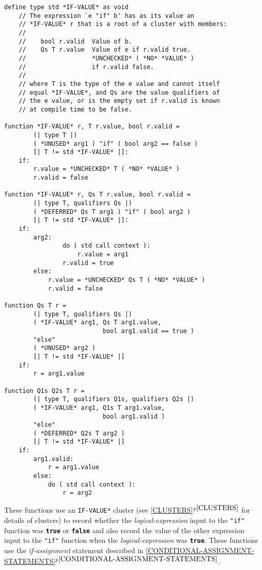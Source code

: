 \documentclass[12pt]{article}
\newcommand{\TT}[1]{{\tt \bfseries #1}}
\newcommand{\itemref}[1]{\ref{#1}$^{p\pageref{#1}}$}
\newenvironment{indpar}[1][0.3in]%
	{\begin{list}{}%
		     {\setlength{\itemsep}{0in}%
		      \setlength{\topsep}{0in}%
		      \setlength{\parsep}{1ex}%
		      \setlength{\labelwidth}{#1}%
		      \setlength{\leftmargin}{#1}%
		      \addtolength{\leftmargin}{\labelsep}}%
	 \item}%
	{\end{list}}
\begin{document}
\begin{indpar}\label{IF-ELSE-IMPLEMENTATION}\begin{verbatim}
define type std *IF-VALUE* as void
    // The expression `e "if" b' has as its value an
    // *IF-VALUE* r that is a root of a cluster with members:
    //
    //    bool r.valid  Value of b.
    //    Qs T r.value  Value of e if r.valid true.
    //                  *UNCHECKED* ( *NO* *VALUE* )
    //                  if r.valid false.
    //
    // where T is the type of the e value and cannot itself
    // equal *IF-VALUE*, and Qs are the value qualifiers of
    // the e value, or is the empty set if r.valid is known
    // at compile time to be false.

function *IF-VALUE* r, T r.value, bool r.valid =
        (| type T |)
        ( *UNUSED* arg1 ) "if" ( bool arg2 == false )
        [| T != std *IF-VALUE* |]:
    if:
        r.value = *UNCHECKED* T ( *NO* *VALUE* )
        r.valid = false

function *IF-VALUE* r, Qs T r.value, bool r.valid =
        (| type T, qualifiers Qs |)
        ( *DEFERRED* Qs T arg1 ) "if" ( bool arg2 )
        [| T != std *IF-VALUE* |]:
    if:
        arg2:
                do ( std call context ):
                    r.value = arg1
                r.valid = true
        else:
            r.value = *UNCHECKED* Qs T ( *NO* *VALUE* )
            r.valid = false

function Qs T r =
        (| type T, qualifiers Qs |)
        ( *IF-VALUE* arg1, Qs T arg1.value,
                           bool arg1.valid == true )
        "else"
        ( *UNUSED* arg2 )
        [| T != std *IF-VALUE* |]
    if:
        r = arg1.value

function Q1s Q2s T r =
        (| type T, qualifiers Q1s, qualifiers Q2s |)
        ( *IF-VALUE* arg1, Q1s T arg1.value,
                           bool arg1.valid )
        "else"
        ( *DEFERRED* Q2s T arg2 )
        [| T != std *IF-VALUE* |]
    if:
        arg1.valid:
            r = arg1.value
        else:
            do ( std call context ):
                r = arg2
\end{verbatim}\end{indpar}

These functions use an {\tt *IF-VALUE*} cluster (see
\itemref{CLUSTERS} for details of clusters) to record
whether the {\em logical-expression} input to the {\tt "if"}
function was \TT{true} or \TT{false} and also record
the value of the other expression input to the {\tt "if"}
function when the {\em logical-expression} was \TT{true}.
These functions use the {\em if-assignment} statement
described in \itemref{CONDITIONAL-ASSIGNMENT-STATEMENTS}.
\end{document}
